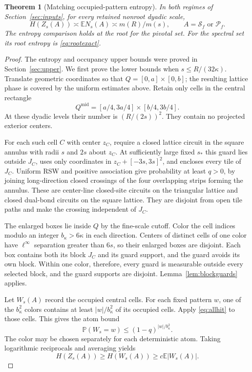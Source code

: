 \documentclass[11pt]{amsart}
\newtheorem{theorem}{Theorem}[section]
\theoremstyle{remark}
\newcommand{\Prob}{\mathbb P}
\newcommand{\E}{\mathbb E}
\newcommand{\cS}{\mathcal S}
\newcommand{\cP}{\mathcal P}
\begin{document}
\begin{theorem}[Matching occupied-pattern entropy]\label{thm:mesoscopic}
In both regimes of Section~\ref{sec:inputs}, for every retained nonroot dyadic scale,
\[
 H(Z_s(A))\asymp\E N_s(A)\asymp m(R)/m(s),
 \qquad A=\cS_f\text{ or }\cP_f.
\]
The entropy comparison holds at the root for the pivotal set. For the spectral set its root entropy is \eqref{eq:rootexact}.
\end{theorem}
\begin{proof}
The entropy and occupancy upper bounds were proved in Section~\ref{sec:upper}. We first prove the lower bounds when $s\le R/(32\kappa)$. Translate geometric coordinates so that $Q=[0,a]\times[0,b]$; the resulting lattice phase is covered by the uniform estimates above. Retain only cells in the central rectangle
\[
 Q^{\mathrm{mid}}=[a/4,3a/4]\times[b/4,3b/4].
\]
At these dyadic levels their number is $(R/(2s))^2$. They contain no projected exterior centers.

For each such cell $C$ with center $z_C$, require a closed lattice circuit in the square annulus with radii $s$ and $2s$ about $z_C$. At sufficiently large fixed $s_*$ this guard lies outside $J_C$, uses only coordinates in $z_C+[-3s,3s]^2$, and encloses every tile of $J_C$. Uniform RSW and positive association give probability at least $q>0$, by joining long-direction closed crossings of the four overlapping strips forming the annulus. These are center-line closed-site circuits on the triangular lattice and closed dual-bond circuits on the square lattice. They are disjoint from open tile paths and make the crossing independent of $J_C$.

The enlarged boxes lie inside $Q$ by the fine-scale cutoff. Color the cell indices modulo an integer $b_\kappa>6\kappa$ in each direction. Centers of distinct cells of one color have $\ell^\infty$ separation greater than $6s$, so their enlarged boxes are disjoint. Each box contains both its block $J_C$ and its guard support, and the guard avoids its own block. Within one color, therefore, every guard is measurable outside every selected block, and the guard supports are disjoint. Lemma~\ref{lem:blockguards} applies.

Let $W_s(A)$ record the occupied central cells. For each fixed pattern $w$, one of the $b_\kappa^2$ colors contains at least $|w|/b_\kappa^2$ of its occupied cells. Apply \eqref{eq:allhit} to those cells. This gives the atom bound
\[
 \Prob(W_s=w)\le(1-q)^{|w|/b_\kappa^2}.
\]
The color may be chosen separately for each deterministic atom. Taking logarithmic reciprocals and averaging yields
\begin{equation}\label{eq:entropybulk}
 H(Z_s(A))\ge H(W_s(A))\ge c\E|W_s(A)|.
\end{equation}


\end{proof}
\end{document}
